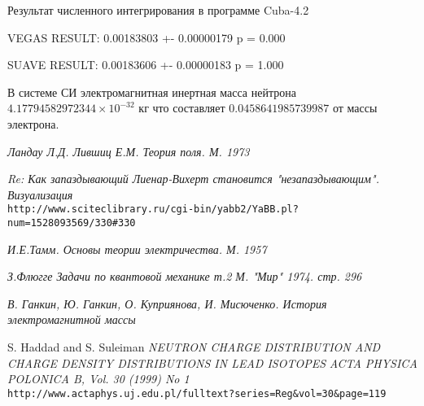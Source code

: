 \documentclass{article}
\begin{document}
Результат численного интегрирования в программе Cuba-4.2

VEGAS RESULT:   0.00183803 +- 0.00000179        p = 0.000

SUAVE RESULT:   0.00183606 +- 0.00000183        p = 1.000

В системе СИ  электромагнитная инертная масса нейтрона $4.17794582972344 \times 10^{-32}$ кг что составляет $0.0458641985739987$ от массы электрона.

\begin{thebibliography}{99}

\textit{Ландау Л.Д. Лившиц Е.М. Теория поля. М. 1973}

\textit{Re: Как запаздывающий Лиенар-Вихерт становится "незапаздывающим". Визуализация}
\\\texttt{http://www.sciteclibrary.ru/cgi-bin/yabb2/YaBB.pl?num=1528093569/330\#330}

\textit{И.Е.Тамм. Основы теории электричества. М. 1957}

\textit{З.Флюгге Задачи по квантовой механике т.2 М. "Мир" 1974. стр. 296}

\textit{В. Ганкин, Ю. Ганкин, О. Куприянова, И. Мисюченко. История электромагнитной массы}


S. Haddad and S. Suleiman
\textit{NEUTRON CHARGE DISTRIBUTION AND CHARGE DENSITY DISTRIBUTIONS IN LEAD ISOTOPES}
\textit{ACTA PHYSICA POLONICA B, Vol. 30 (1999) No 1}
\\\texttt{http://www.actaphys.uj.edu.pl/fulltext?series=Reg\&vol=30\&page=119}



\end{thebibliography}
\end{document}
